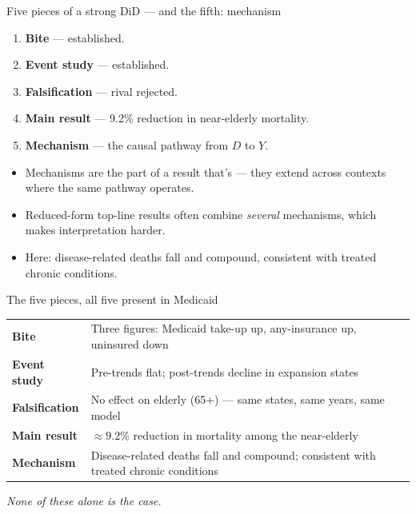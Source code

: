\documentclass[aspectratio=169,11pt]{beamer}
\begin{document}
\begin{frame}{Five pieces of a strong DiD --- and the fifth: mechanism}
\vspace{0.3em}
\begin{enumerate}\setlength\itemsep{1pt}
  \item \textbf{\color{warmgray!40}Bite} \textcolor{warmgray!40}{--- established.}
  \item \textbf{\color{warmgray!40}Event study} \textcolor{warmgray!40}{--- established.}
  \item \textbf{\color{warmgray!40}Falsification} \textcolor{warmgray!40}{--- rival rejected.}
  \item \textbf{\color{warmgray!40}Main result} \textcolor{warmgray!40}{--- 9.2\% reduction in near-elderly mortality.}
  \item \textbf{\color{accent}Mechanism} --- the causal pathway from $D$ to $Y$.
\end{enumerate}
\vspace{0.5em}
\begin{itemize}\setlength\itemsep{2pt}\small
  \item Mechanisms are the part of a result that's  --- they extend across contexts where the same pathway operates.
  \item Reduced-form top-line results often combine \textit{several} mechanisms, which makes interpretation harder.
  \item Here: disease-related deaths fall and compound, consistent with treated chronic conditions.
\end{itemize}
\end{frame}

\begin{frame}{The five pieces, all five present in Medicaid}
\vspace{0.4em}
\begin{center}
\renewcommand{\arraystretch}{1.45}
\footnotesize
\begin{tabular}{@{}p{} p{}@{}}
\toprule
\textbf{Bite} & Three figures: Medicaid take-up up, any-insurance up, uninsured down \\
\textbf{Event study} & Pre-trends flat; post-trends decline in expansion states \\
\textbf{Falsification} & No effect on elderly (65+) --- same states, same years, same model \\
\textbf{Main result} & $\approx 9.2\%$ reduction in mortality among the near-elderly \\
\textbf{Mechanism} & Disease-related deaths fall and compound; consistent with treated chronic conditions \\
\bottomrule
\end{tabular}
\end{center}
\vspace{0.6em}
\begin{center}
\small\color{warmgray}\itshape
None of these alone is the case. \;
\end{center}
\end{frame}
\end{document}
